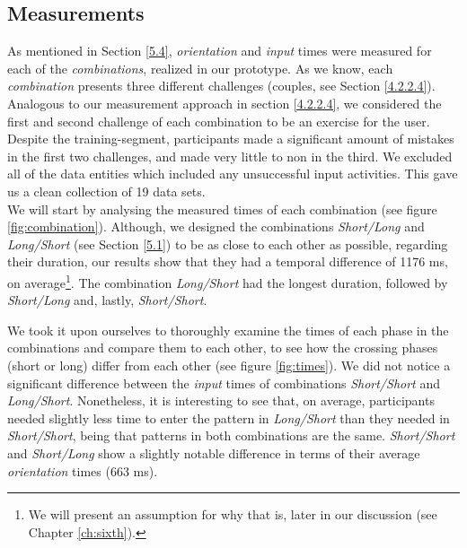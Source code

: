 \subsection{Measurements}

 As mentioned in Section \ref{5.4}, \textit{orientation} and \textit{input} times were measured for each of the \textit{combinations}, realized in our prototype. As we know, each \textit{combination} presents three different challenges (couples, see Section \ref{4.2.2.4}). Analogous to our measurement approach in section \ref{4.2.2.4}, we considered the first and second challenge of each combination to be an exercise for the user. Despite the training-segment, participants made a significant amount of mistakes in the first two challenges, and made very little to non in the third. We excluded all of the data entities which included any unsuccessful input activities. This gave us a clean collection of 19 data sets. \\

We will start by analysing the measured times of each combination (see figure \ref{fig:combination}). Although, we designed the combinations \textit{Short/Long} and \textit{Long/Short} (see Section \ref{5.1}) to be as close to each other as possible, regarding their duration, our results show that they had a temporal difference of 1176 ms, on average\footnote{We will present an assumption for why that is, later in our discussion (see Chapter \ref{ch:sixth}).}. The combination \textit{Long/Short} had the longest duration, followed by \textit{Short/Long} and, lastly, \textit{Short/Short}.

We took it upon ourselves to thoroughly examine the times of each phase in the combinations and compare them to each other, to see how the crossing phases (short or long) differ from each other (see figure \ref{fig:times}). We did not notice a significant difference between the \textit{input} times of combinations \textit{Short/Short} and \textit{Long/Short}. Nonetheless, it is interesting to see that, on average, participants needed slightly less time to enter the pattern in \textit{Long/Short} than they needed in \textit{Short/Short}, being that patterns in both combinations are the same. \textit{Short/Short} and \textit{Short/Long} show a slightly notable difference in terms of their average \textit{orientation} times (663 ms). 


